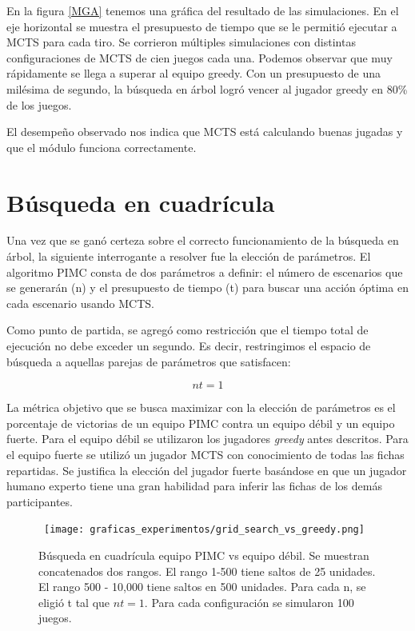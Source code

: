 En la figura \ref{MGA} tenemos una gráfica del resultado de las simulaciones. En
el eje horizontal se muestra el presupuesto de tiempo que se le permitió
ejecutar a MCTS para cada tiro. Se corrieron múltiples simulaciones con
distintas configuraciones de MCTS de cien juegos cada una. Podemos observar que
muy rápidamente se llega a superar al equipo greedy. Con un presupuesto de una
milésima de segundo, la búsqueda en árbol logró vencer al jugador greedy en 80\%
de los juegos.

El desempeño observado nos indica que MCTS está calculando buenas jugadas y que
el módulo funciona correctamente.


\section{Búsqueda en cuadrícula}

Una vez que se ganó certeza sobre el correcto funcionamiento de la búsqueda en
árbol, la siguiente interrogante a resolver fue la elección de parámetros. El
algoritmo PIMC consta de dos parámetros a definir: el número de escenarios que
se generarán (n) y el presupuesto de tiempo (t) para buscar una acción óptima en
cada escenario usando MCTS.

Como punto de partida, se agregó como restricción que el tiempo total de
ejecución no debe exceder un segundo. Es decir, restringimos el espacio de
búsqueda a aquellas parejas de parámetros que satisfacen: 


\[nt = 1 \]

La métrica objetivo que se busca maximizar con la elección de parámetros es el
porcentaje de victorias de un equipo PIMC contra un equipo débil y un equipo
fuerte. Para el equipo débil se utilizaron los jugadores \textit{greedy} antes
descritos. Para el equipo fuerte se utilizó un jugador MCTS con conocimiento de
todas las fichas repartidas. Se justifica la elección del jugador fuerte
basándose en que un jugador humano experto tiene una gran habilidad para inferir
las fichas de los demás participantes.

\begin{figure}[H]
    \begin{center}
        \hbox{\hspace{-2em}
        \texttt{[image: graficas\_experimentos/grid\_search\_vs\_greedy.png]}}
        \caption{Búsqueda en cuadrícula equipo PIMC vs equipo débil. Se muestran
        concatenados dos rangos. El rango 1-500 tiene saltos de 25 unidades. El
        rango 500 - 10,000 tiene saltos en 500 unidades. Para cada n, se eligió
        t tal que \(nt = 1\). Para cada configuración se simularon 100 juegos.}
        \label{GSW}
    \end{center}
\end{figure}

